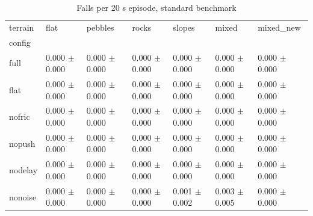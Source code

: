 \begin{table}
\caption{Falls per 20 s episode, standard benchmark}
\label{tab:tab_falls_base}
\begin{tabular}{lllllll}
\toprule
terrain & flat & pebbles & rocks & slopes & mixed & mixed_new \\
config &  &  &  &  &  &  \\
\midrule
full & 0.000 $\pm$ 0.000 & 0.000 $\pm$ 0.000 & 0.000 $\pm$ 0.000 & 0.000 $\pm$ 0.000 & 0.000 $\pm$ 0.000 & 0.000 $\pm$ 0.000 \\
flat & 0.000 $\pm$ 0.000 & 0.000 $\pm$ 0.000 & 0.000 $\pm$ 0.000 & 0.000 $\pm$ 0.000 & 0.000 $\pm$ 0.000 & 0.000 $\pm$ 0.000 \\
nofric & 0.000 $\pm$ 0.000 & 0.000 $\pm$ 0.000 & 0.000 $\pm$ 0.000 & 0.000 $\pm$ 0.000 & 0.000 $\pm$ 0.000 & 0.000 $\pm$ 0.000 \\
nopush & 0.000 $\pm$ 0.000 & 0.000 $\pm$ 0.000 & 0.000 $\pm$ 0.000 & 0.000 $\pm$ 0.000 & 0.000 $\pm$ 0.000 & 0.000 $\pm$ 0.000 \\
nodelay & 0.000 $\pm$ 0.000 & 0.000 $\pm$ 0.000 & 0.000 $\pm$ 0.000 & 0.000 $\pm$ 0.000 & 0.000 $\pm$ 0.000 & 0.000 $\pm$ 0.000 \\
nonoise & 0.000 $\pm$ 0.000 & 0.000 $\pm$ 0.000 & 0.000 $\pm$ 0.000 & 0.001 $\pm$ 0.002 & 0.003 $\pm$ 0.005 & 0.000 $\pm$ 0.000 \\
\bottomrule
\end{tabular}
\end{table}
